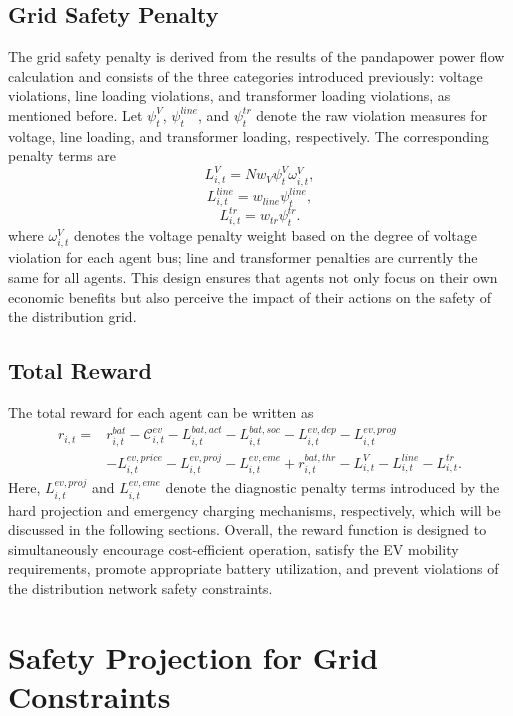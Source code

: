 \subsection{Grid Safety Penalty}

The grid safety penalty is derived from the results of the pandapower power flow calculation and consists of the three categories introduced previously: voltage violations, line loading violations, and transformer loading violations, as mentioned before. Let \(\psi^V_t\), \(\psi^{line}_t\), and \(\psi^{tr}_t\) denote the raw violation measures for voltage, line loading, and transformer loading, respectively. The corresponding penalty terms are
\[
  L^V_{i,t}=Nw_V\psi^V_t\omega^V_{i,t},
\]
\[
  L^{line}_{i,t}=w_{line}\psi^{line}_t,
\]
\[
  L^{tr}_{i,t}=w_{tr}\psi^{tr}_t.
\]
where \(\omega^V_{i,t}\) denotes the voltage penalty weight based on the degree of voltage violation for each agent bus; line and transformer penalties are currently the same for all agents. This design ensures that agents not only focus on their own economic benefits but also perceive the impact of their actions on the safety of the distribution grid.

\subsection{Total Reward}

The total reward for each agent can be written as
\[
\begin{array}{ll}
r_{i,t}={}&
r^{bat}_{i,t}
-\mathcal{C}^{ev}_{i,t}
-L^{bat,act}_{i,t}
-L^{bat,soc}_{i,t}
-L^{ev,dep}_{i,t}
-L^{ev,prog}_{i,t}\\[1mm]
&
-L^{ev,price}_{i,t}
-L^{ev,proj}_{i,t}
-L^{ev,eme}_{i,t}
+r^{bat,thr}_{i,t}
-L^V_{i,t}
-L^{line}_{i,t}
-L^{tr}_{i,t}.
\end{array}
\]
Here, \(L^{ev,proj}_{i,t}\) and \(L^{ev,eme}_{i,t}\) denote the diagnostic penalty terms introduced by the hard projection and emergency charging mechanisms, respectively, which will be discussed in the following sections. Overall, the reward function is designed to simultaneously encourage cost-efficient operation, satisfy the EV mobility requirements, promote appropriate battery utilization, and prevent violations of the distribution network safety constraints.

\section{Safety Projection for Grid Constraints}

